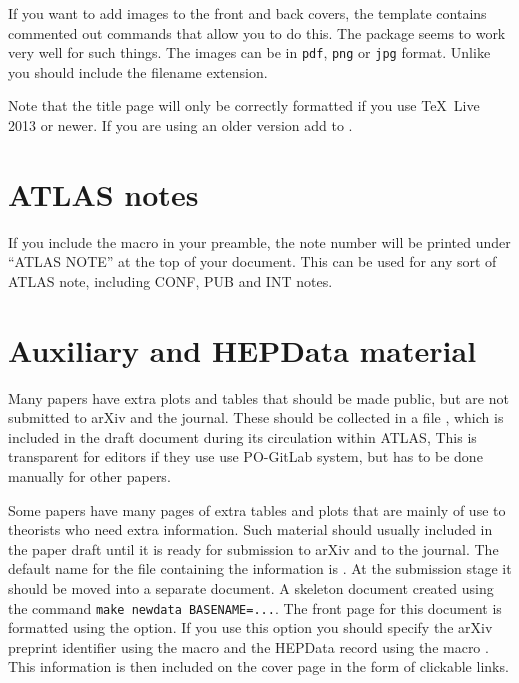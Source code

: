 If you want to add images to the front and back covers,
the template contains commented out commands that allow you to do this.
The  package seems to work very well for such things.
The images can be in \texttt{pdf}, \texttt{png} or \texttt{jpg} format.
Unlike  you should include the filename extension.

Note that the title page will only be correctly formatted if you use 
\TeX\ Live 2013 or newer. If you are using an older version add 
to .

\section{ATLAS notes}
\label{sec:note}

If you include the macro  in your preamble,
the note number will be printed under \enquote{ATLAS NOTE} at the top of your document.
This can be used for any sort of ATLAS note, including CONF, PUB and INT notes.


\section{Auxiliary and HEPData material}
\label{sec:auxmat}

Many papers have extra plots and tables that should be made public,
but are not submitted to arXiv and the journal.
These should be collected in a file ,
which is included in the draft document during its circulation within ATLAS,
This is transparent for editors if they use use PO-GitLab system,
but has to be done manually for other papers.

Some papers have many pages of extra tables and plots that are mainly of use to theorists
who need extra information.
Such material should usually included in the paper draft until it is ready for
submission to arXiv and to the journal.
The default name for the file containing the information is .
At the submission stage it should be moved into a separate document.
A skeleton document created using the command \verb|make newdata BASENAME=...|.
The front page for this document is formatted using the  option.
If you use this option you should specify the arXiv preprint identifier
using the macro  and the HEPData record using the macro
.
This information is then included on the cover page in the form of clickable links.


